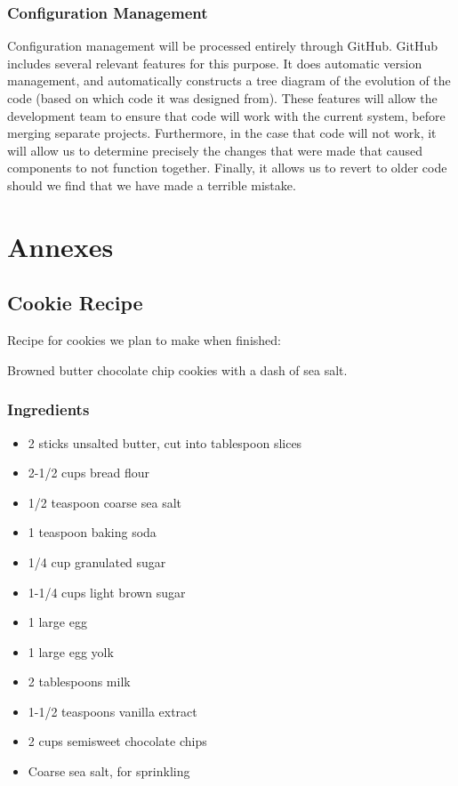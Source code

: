 \documentclass{article}
\begin{document}
\subsubsection{Configuration Management}
Configuration management will be processed entirely through GitHub.  GitHub includes several relevant features for this purpose.  It does automatic version management, and automatically constructs a tree diagram of the evolution of the code (based on which code it was designed from).  These features will allow the development team to ensure that code will work with the current system, before merging separate projects.  Furthermore, in the case that code will not work, it will allow us to determine precisely the changes that were made that caused components to not function together.  Finally, it allows us to revert to older code should we find that we have made a terrible mistake.
\section{Annexes}
\subsection{Cookie Recipe}
Recipe for cookies we plan to make when finished:

Browned butter chocolate chip cookies with a dash of sea salt.
\subsubsection{Ingredients}
\begin{itemize}
\item 2 sticks unsalted butter, cut into tablespoon slices
\item 2-1/2 cups bread flour
\item 1/2 teaspoon coarse sea salt
\item 1 teaspoon baking soda
\item 1/4 cup granulated sugar
\item 1-1/4 cups light brown sugar
\item 1 large egg
\item 1 large egg yolk
\item 2 tablespoons milk
\item 1-1/2 teaspoons vanilla extract
\item 2 cups semisweet chocolate chips
\item Coarse sea salt, for sprinkling
\end{itemize}
\end{document}

